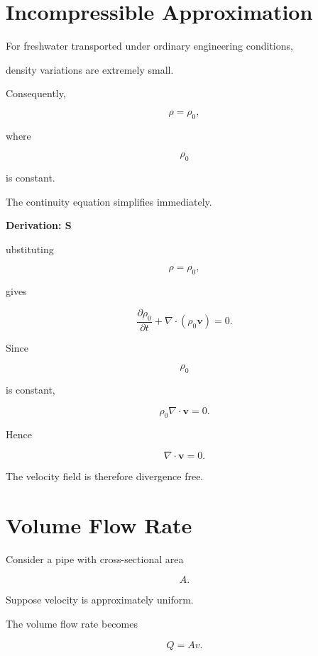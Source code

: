 \documentclass[11pt,fleqn]{book}
\numberwithin{equation}{chapter}
\newenvironment{derivation}[1]
  {\begin{derivationEnv}
   \noindent\textbf{Derivation: #1}\par\smallskip}
  {\end{derivationEnv}}
\theoremstyle{plain}
\theoremstyle{definition}
\theoremstyle{remark}
\begin{document}

\section{Incompressible Approximation}

For freshwater transported under ordinary engineering conditions,

density variations are extremely small.

Consequently,

\[
\rho
=
\rho_0,
\]

where

\[
\rho_0
\]

is constant.

The continuity equation simplifies immediately.


\begin{derivation}

Substituting

\[
\rho=\rho_0,
\]

gives

\[
\frac{\partial\rho_0}{\partial t}
+
\nabla\cdot(\rho_0\mathbf v)
=
0.
\]

Since

\[
\rho_0
\]

is constant,

\[
\rho_0
\nabla\cdot\mathbf v
=
0.
\]

Hence

\[
\boxed{
\nabla\cdot\mathbf v=0.
}
\]

\end{derivation}

The velocity field is therefore divergence free.


\section{Volume Flow Rate}

Consider a pipe with cross-sectional area

\[
A.
\]

Suppose velocity is approximately uniform.

The volume flow rate becomes

\[
Q
=
Av.
\]
\end{document}
